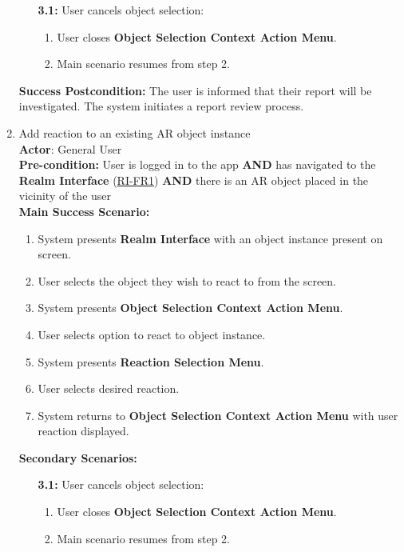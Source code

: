 \documentclass{article}
\begin{document}
\begin{enumerate}[label=\textbf{UC\arabic*}]
\begin{itemize}
            \item[{\bf 3.1:}] User cancels object selection:
            \begin{enumerate}[label=\textbf{\arabic*.}]
                \item User closes \textbf{Object Selection Context Action Menu}.
                \item Main scenario resumes from step 2.
            \end{enumerate}
        \end{itemize}

        \textbf{Success Postcondition:} The user is informed that their report will be investigated. The system initiates a report review process.

    \item \label{uc:15} Add reaction to an existing AR object instance \\ 
        \textbf{Actor}: General User \\ 
        \textbf{Pre-condition:} User is logged in to the app \textbf{AND} has navigated to the \textbf{Realm Interface} (\hyperref[ssub:realm_interface]{RI-FR1}) \textbf{AND} there is an AR object placed in the vicinity of the user \\

        \textbf{Main Success Scenario:}
        \begin{enumerate}[label=\textbf{\arabic*.}]
            \item System presents \textbf{Realm Interface} with an object instance present on screen.
            \item User selects the object they wish to react to from the screen.
            \item System presents \textbf{Object Selection Context Action Menu}.
            \item User selects option to react to object instance.
            \item System presents \textbf{Reaction Selection Menu}.
            \item User selects desired reaction.
            \item System returns to \textbf{Object Selection Context Action Menu} with user reaction displayed.
        \end{enumerate}

        \textbf{Secondary Scenarios:}
        \begin{itemize}
            \item[{\bf 3.1:}] User cancels object selection:
            \begin{enumerate}[label=\textbf{\arabic*.}]
                \item User closes \textbf{Object Selection Context Action Menu}.
                \item Main scenario resumes from step 2.
            \end{enumerate}
        \end{itemize}


\end{enumerate}
\end{document}
